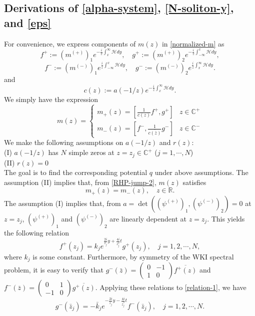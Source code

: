 \documentclass[11pt]{article}
\newcommand{\RR}{{\mathbb R}}
\newcommand{\CC}{{\mathbb C}}
\newcommand{\HH}{\mathcal{H}}
\begin{document}
\subsection{Derivations of \eqref{alpha-system}, \eqref{N-soliton-y}, and \eqref{eps}}
 For convenience, we express components of $m(z)$ in \eqref{normalized-m} as 
$$f^+:= (m^{(+)})_1e^{-\frac{i}{z}\int_x^{\infty}\HH dy}, \quad g^+:= (m^{(+)})_2e^{-\frac{i}{z}\int_{-\infty}^x\HH dy},$$
$$f^-:= (m^{(-)})_1e^{\frac{i}{z}\int_{-\infty}^x\HH dy}, \quad g^-:= (m^{(-)})_2e^{\frac{i}{z}\int_x^{\infty}\HH dy}.$$
and 
$$c(z):=a(-1/z)e^{-\frac{i}{z}\int_x^{\infty}\HH dy}.$$
We simply have the expression
$$m(z) = \left\{ \begin{matrix}m_+(z)= \left[ \frac{1}{c(z)}f^+, g^+ \right] & z \in \CC^+ \\
 m_-(z)=[f^-,  \frac{1}{\overline{c(\bar{z})}}g^-] & z \in \CC^- 
 \end{matrix} \right.
$$
We make the following assumptions on $a(-1/z)$ and $r(z)$:\\
(I) $a(-1/z)$ has $N$ simple zeros at $z=z_j \in \CC^+$ ($j=1,\cdots, N$)\\
(II) $r(z)=0$\\ 
The goal is to find the corresponding potential $q$ under above assumptions.
The assumption (II) implies that, from \eqref{RHP-jump-2}, $m(z)$ satisfies 
\begin{equation}\label{jump-r-zero}
m_+(z)=m_-(z), \quad z\in \RR.
\end{equation}
The assumption (I) implies that, from $a=\det((\psi^{(+)})_1,(\psi^{(-)})_2)=0$ at $z=z_{j}$, $(\psi^{(+)})_1$ and $(\psi^{(-)})_2$ are linearly dependent at $z=z_{j}$. This yields the following relation 
\begin{equation} \label{relation-1}
f^+(z_j)=k_j e^{\frac{2i}{z_j}y+\frac{4i}{z_j^2}t}g^+(z_j), \quad j=1,2,\cdots, N,
\end{equation}
where $k_j$ is some constant. Furthermore, by symmetry of the WKI spectral problem, it is easy to verify that $g^-(\bar{z})=\begin{pmatrix} 0 & -1\\ 1 &0\end{pmatrix} \overline{f^+(z)}$ and $f^-(\bar{z})=\begin{pmatrix} 0 & 1\\ -1 &0\end{pmatrix} \overline{g^+(z)}$. Applying these relations to \eqref{relation-1}, we have
\begin{equation} \label{relation-2}
g^-(\bar{z}_j)=-\bar{k}_j e^{-\frac{2i}{\bar{z}_j}y-\frac{4i}{\bar{z}_j^2}t}f^-(\bar{z}_j),  \quad j=1,2,\cdots, N.
\end{equation}
\end{document}
